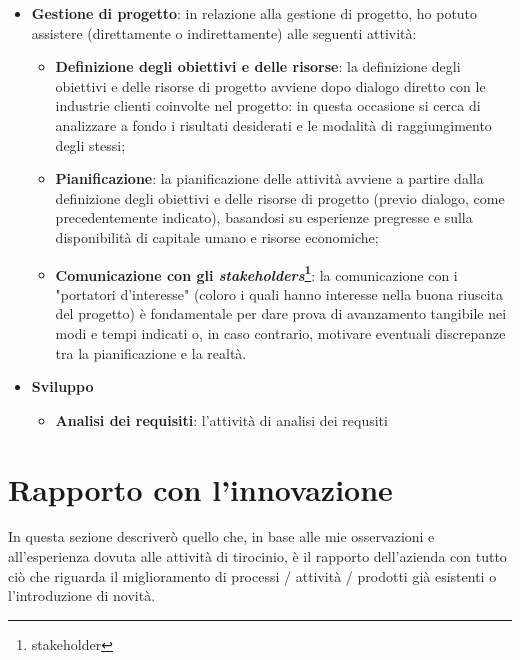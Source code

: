 \begin{itemize}
    \item \textbf{Gestione di progetto}: in relazione alla gestione di progetto, ho potuto assistere (direttamente o indirettamente) alle seguenti attività:
        \begin{itemize}
            \item \textbf{Definizione degli obiettivi e delle risorse}: la definizione degli obiettivi e delle risorse di progetto avviene dopo dialogo diretto con le industrie clienti coinvolte nel progetto: in questa occasione si cerca di analizzare a fondo 
                i risultati desiderati e le modalità di raggiungimento degli stessi;
            \item \textbf{Pianificazione}: la pianificazione delle attività avviene a partire dalla definizione degli obiettivi e delle risorse di progetto (previo dialogo, come precedentemente indicato), 
                basandosi su esperienze pregresse e sulla disponibilità di capitale umano e risorse economiche;
            \item \textbf{Comunicazione con gli \textit{stakeholders}\footnote{\gls{stakeholder}}}: la comunicazione con i "portatori d'interesse" (coloro i quali hanno interesse nella buona riuscita del progetto) è fondamentale per dare prova di avanzamento tangibile nei modi e tempi indicati o, in caso contrario,
                motivare eventuali discrepanze tra la pianificazione e la realtà.
        \end{itemize}
    \item \textbf{Sviluppo}
        \begin{itemize}
            \item \textbf{Analisi dei requisiti}: l'attività di analisi dei requsiti 
        \end{itemize}
\end{itemize}


\section{Rapporto con l'innovazione}

In questa sezione descriverò quello che, in base alle mie osservazioni e all'esperienza dovuta alle attività di tirocinio, è il rapporto dell'azienda con tutto ciò che riguarda il miglioramento di processi / attività / prodotti già esistenti o l'introduzione di novità.